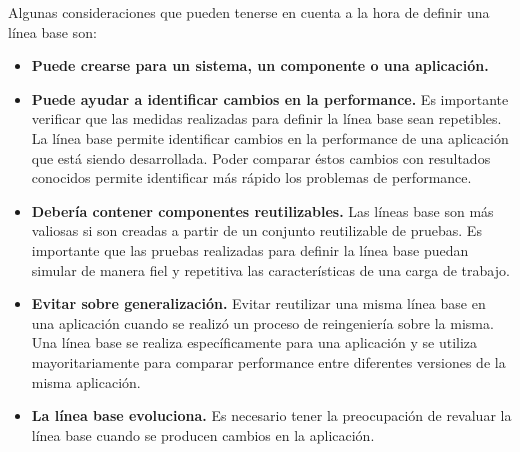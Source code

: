 Algunas consideraciones que pueden tenerse en cuenta a la hora de definir una línea base son:
\begin{itemize}
	\item
	\textbf{Puede crearse para un sistema, un componente o una aplicación.}
	\item
	\textbf{Puede ayudar a identificar cambios en la performance.} Es importante verificar que las medidas realizadas para definir la línea base sean repetibles. La línea base permite
identificar cambios en la performance de una aplicación que está siendo desarrollada. Poder comparar
éstos cambios con resultados conocidos permite identificar más rápido los problemas de performance.
	\item
	\textbf{Debería contener componentes reutilizables.} Las líneas base son más valiosas si son creadas a partir de un conjunto reutilizable de pruebas. Es
importante que las pruebas realizadas para definir la línea base puedan simular de manera fiel y repetitiva las características de una carga de trabajo.
	\item
	\textbf{Evitar sobre generalización.} Evitar reutilizar una misma línea base en una aplicación cuando se realizó un proceso de reingeniería sobre la misma. Una línea base se realiza específicamente para una aplicación y se utiliza mayoritariamente para comparar performance entre diferentes versiones de la misma aplicación.
	\item
	\textbf{La línea base evoluciona.} Es necesario tener la preocupación de revaluar la línea base cuando se producen cambios en la aplicación.
\end{itemize}

